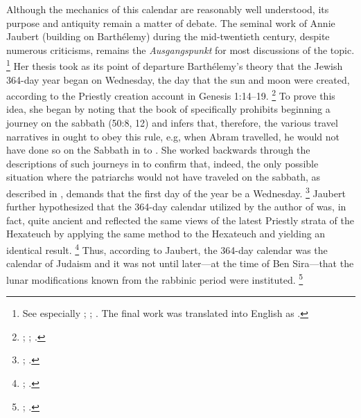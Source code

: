 Although the mechanics of this calendar are reasonably well understood, its purpose and antiquity remain a matter of debate. The seminal work of Annie Jaubert (building on Barthélemy) during the mid-twentieth century, despite numerous criticisms, remains the \emph{Ausgangspunkt} for most discussions of the topic.%
    \footnote{%
        See especially
        \cite{jaubert_vt1953};
        \cite{jaubert_vt1957};
        \cite{jaubert1957}.
        The final work was translated into English as
        \cite*{jaubert1965}.}
Her thesis took as its point of departure Barthélemy's theory that the Jewish 364-day year began on Wednesday, the day that the sun and moon were created, according to the Priestly creation account in Genesis 1:14--19.%
    \footnote{%
        \cite{barthelemy_rb1952};
        \cite[250]{jaubert_vt1953};
        \cite[24--25]{jaubert1965}.}
To prove this idea, she began by noting that the book of \jub specifically prohibits beginning a journey on the sabbath (50:8, 12) and infers that, therefore, the various travel narratives in \jub ought to obey this rule, e.g, when Abram travelled, he would not have done so on the Sabbath in to \jub. She worked backwards through the descriptions of such journeys in \jub to confirm that, indeed, the only possible situation where the patriarchs would not have traveled on the sabbath, as described in \jub, demands that the first day of the year be a Wednesday.%
    \footnote{%
        \cite[252--254]{jaubert_vt1953};
        \cite[25--27]{jaubert1965}.}
Jaubert further hypothesized that the 364-day calendar utilized by the author of \jub was, in fact, quite ancient and reflected the same views of the latest Priestly strata of the Hexateuch by applying the same method to the Hexateuch and yielding an identical result.%
    \footnote{%
        \cite[258]{jaubert_vt1953};
        \cite[33]{jaubert1965}.}
Thus, according to Jaubert, the 364-day calendar was the calendar of \secondtemple Judaism and it was not until later---at the time of Ben Sira---that the lunar modifications known from the rabbinic period were instituted.%
    \footnote{%
        \cite[254--258; 262--264]{jaubert_vt1953};
        \cite[47--51]{jaubert1965}.}

